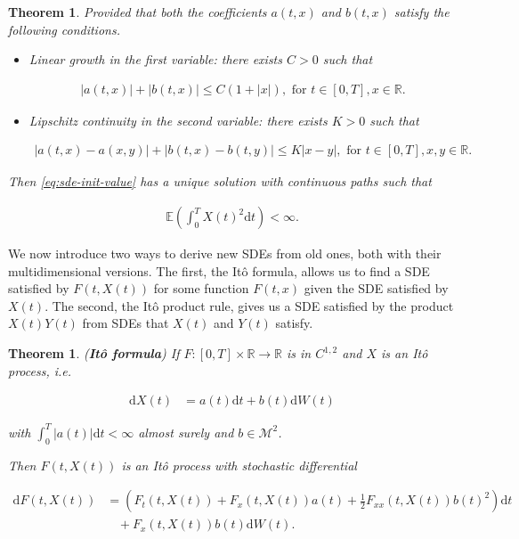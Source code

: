 \documentclass[a4paper]{article}
\newtheorem{theorem}[definition]{Theorem}
\begin{document}
\begin{theorem}\label{eq:sde-solution}
  Provided that both the coefficients $a(t,x)$ and $b(t,x)$ satisfy the following conditions.

  \begin{itemize}
    \item Linear growth in the first variable: there exists $C > 0$ such that

      \begin{align*}
        |a(t,x)| + |b(t,x)| \le C (1 + |x|), \text{ for } t \in [0,T], x \in \mathbb{R}.
      \end{align*}

    \item Lipschitz continuity in the second variable: there exists $K > 0$ such that

      \begin{align*}
        |a(t,x) - a(x,y)| + |b(t,x) - b(t,y)| \le K |x-y|, \text{ for } t \in [0,T], x,y \in \mathbb{R}.
      \end{align*}
  \end{itemize}

  Then \eqref{eq:sde-init-value} has a unique solution with continuous paths such that

  \begin{align*}
    \mathbb{E}\left(\int_0^T X(t)^2 \mathrm{d}t\right) < \infty.
  \end{align*}
\end{theorem}

We now introduce two ways to derive new SDEs from old ones, both with their multidimensional versions. The first, the It\^o formula, allows us to find a SDE satisfied by $F(t,X(t))$ for some function $F(t,x)$ given the SDE satisfied by $X(t)$. The second, the It\^o product rule, gives us a SDE satisfied by the product $X(t)Y(t)$ from SDEs that $X(t)$ and $Y(t)$ satisfy.

\begin{theorem}\label{eq:ito-formula}
  (\textbf{It\^o formula}) If $F : [0,T] \times \mathbb{R} \to \mathbb{R}$ is in $C^{1,2}$ and $X$ is an It\^o process, i.e.

  \begin{align*}
    \mathrm{d}X(t) &= a(t) \mathrm{d}t + b(t) \mathrm{d}W(t)
  \end{align*}

  with $\int_0^T |a(t)| \mathrm{d}t < \infty$ almost surely and $b \in \mathcal{M}^2$.

  Then $F(t,X(t))$ is an It\^o process with stochastic differential

  \begin{align*}
    \mathrm{d}F(t,X(t)) &= \left(F_t(t,X(t)) + F_x(t,X(t)) a(t) + \frac{1}{2} F_{xx}(t,X(t)) b(t)^2 \right) \mathrm{d}t\\
    &\ \ \ \ + F_x(t,X(t)) b(t) \mathrm{d}W(t).
  \end{align*}
\end{theorem}
\end{document}
